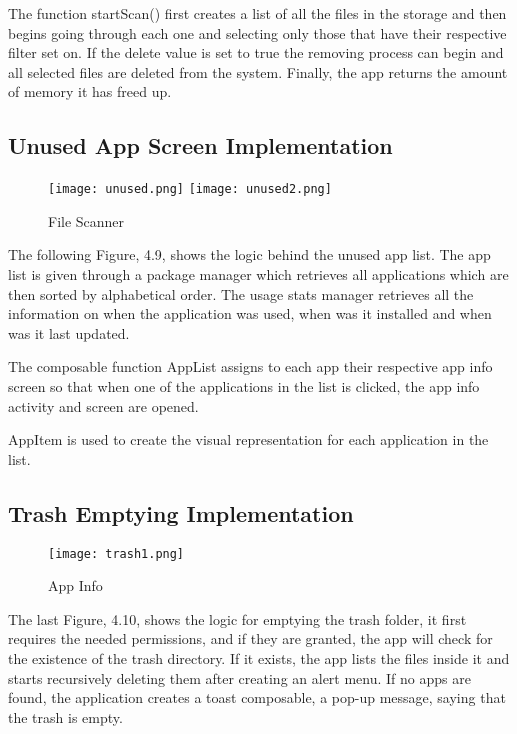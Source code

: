 The function startScan() first creates a list of all the files in the storage and then begins going through each one and selecting only those that have their respective filter set on. If the delete value is set to true the removing process can begin and all selected files are deleted from the system. Finally, the app returns the amount of memory it has freed up.
\newpage

\subsection{Unused App Screen Implementation}\label{subsect:Unused App Screen Implementation}


\begin{figure}[htp]
    \centering
    \texttt{[image: unused.png]}
    \texttt{[image: unused2.png]}
    \caption{File Scanner}
    \label{fig: File Scanner}
\end{figure}

The following Figure, 4.9, shows the logic behind the unused app list. The app list is given through a package manager which retrieves all applications which are then sorted by alphabetical order. The usage stats manager retrieves all the information on when the application was used, when was it installed and when was it last updated.

The composable function AppList assigns to each app their respective app info screen so that when one of the applications in the list is clicked, the app info activity and screen are opened.

AppItem is used to create the visual representation for each application in the list.

\newpage

\subsection{Trash Emptying Implementation}\label{subsect:Trash Emptying Implementation}

\begin{figure}[htp]
    \centering
    \texttt{[image: trash1.png]}
    \caption{App Info}
    \label{fig: Emptying trash logic}
\end{figure}

The last Figure, 4.10, shows the logic for emptying the trash folder, it first requires the needed permissions, and if they are granted, the app will check for the existence of the trash directory. If it exists, the app lists the files inside it and starts recursively deleting them after creating an alert menu. If no apps are found, the application creates a toast composable, a pop-up message, saying that the trash is empty.


\newpage
